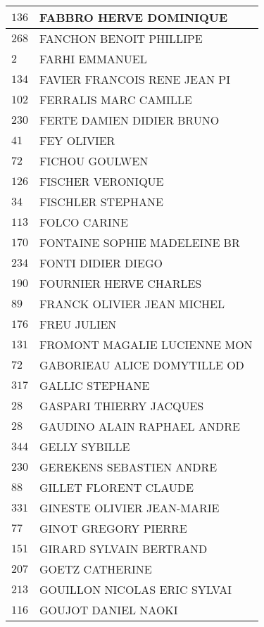 \begin{xltabular}{\linewidth}{|l|X|}
    \hline
    $136$ & FABBRO HERVE DOMINIQUE \\
    \hline
    $268$ & FANCHON BENOIT PHILLIPE \\
    \hline
    $2$ & FARHI EMMANUEL \\
    \hline
    $134$ & FAVIER FRANCOIS RENE JEAN PI \\
    \hline
    $102$ & FERRALIS MARC CAMILLE \\
    \hline
    $230$ & FERTE DAMIEN DIDIER BRUNO \\
    \hline
    $41$ & FEY OLIVIER \\
    \hline
    $72$ & FICHOU GOULWEN \\
    \hline
    $126$ & FISCHER VERONIQUE \\
    \hline
    $34$ & FISCHLER STEPHANE \\
    \hline
    $113$ & FOLCO CARINE \\
    \hline
    $170$ & FONTAINE SOPHIE MADELEINE BR \\
    \hline
    $234$ & FONTI DIDIER DIEGO \\
    \hline
    $190$ & FOURNIER HERVE CHARLES \\
    \hline
    $89$ & FRANCK OLIVIER JEAN MICHEL \\
    \hline
    $176$ & FREU JULIEN \\
    \hline
    $131$ & FROMONT MAGALIE LUCIENNE MON \\
    \hline
    $72$ & GABORIEAU ALICE DOMYTILLE OD \\
    \hline
    $317$ & GALLIC STEPHANE \\
    \hline
    $28$ & GASPARI THIERRY JACQUES \\
    \hline
    $28$ & GAUDINO ALAIN RAPHAEL ANDRE \\
    \hline
    $344$ & GELLY SYBILLE \\
    \hline
    $230$ & GEREKENS SEBASTIEN ANDRE \\
    \hline
    $88$ & GILLET FLORENT CLAUDE \\
    \hline
    $331$ & GINESTE OLIVIER JEAN-MARIE \\
    \hline
    $77$ & GINOT GREGORY PIERRE \\
    \hline
    $151$ & GIRARD SYLVAIN BERTRAND \\
    \hline
    $207$ & GOETZ CATHERINE \\
    \hline
    $213$ & GOUILLON NICOLAS ERIC SYLVAI \\
    \hline
    $116$ & GOUJOT DANIEL NAOKI \\

\end{xltabular}
